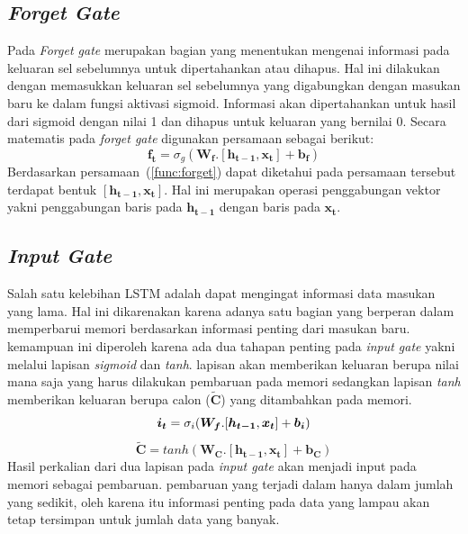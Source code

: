 \subsection{\textit{Forget Gate}}
Pada \textit{Forget gate} merupakan bagian yang menentukan mengenai informasi pada keluaran sel sebelumnya untuk dipertahankan atau dihapus. Hal ini dilakukan dengan memasukkan keluaran sel sebelumnya yang digabungkan dengan masukan baru ke dalam fungsi aktivasi sigmoid. Informasi akan dipertahankan untuk hasil dari sigmoid dengan nilai 1 dan dihapus untuk keluaran yang bernilai 0. Secara matematis pada \textit{forget gate} digunakan persamaan sebagai berikut:
\begin{equation}
	\boldsymbol{f_t} = \sigma_g(\boldsymbol{W_{f}}.[\boldsymbol{h_{t-1}}, \boldsymbol{x_t}] + \boldsymbol{b_f})
	\label{func:forget}
\end{equation} 
Berdasarkan persamaan~(\ref{func:forget}) dapat diketahui pada persamaan tersebut terdapat bentuk $[\boldsymbol{h_{t-1}}, \boldsymbol{x_t}]$. Hal ini merupakan operasi penggabungan vektor yakni penggabungan baris pada $\boldsymbol{h_{t-1}}$ dengan baris pada $\boldsymbol{x_t}$.
\subsection{\textit{Input Gate}}
Salah satu kelebihan LSTM adalah dapat mengingat informasi data masukan yang lama. Hal ini dikarenakan karena adanya satu bagian yang berperan dalam memperbarui memori berdasarkan informasi penting dari masukan baru. kemampuan ini diperoleh karena ada dua tahapan penting pada \textit{input gate} yakni melalui lapisan \textit{sigmoid} dan \textit{tanh}. lapisan akan memberikan keluaran berupa nilai mana saja yang harus dilakukan pembaruan pada memori sedangkan lapisan \textit{tanh} memberikan keluaran berupa calon ($\boldsymbol{\tilde{C}}$) yang ditambahkan pada memori. 
\begin{equation}
	\boldsymbol{i_t} = \sigma_i(\boldsymbol{W_{f}}.[\boldsymbol{h_{t-1}}, \boldsymbol{x_t}] + \boldsymbol{b_i})\\
	\label{func:input}
\end{equation}
\begin{equation}
	\boldsymbol{\tilde{C}} = tanh(\boldsymbol{W_{C}}.[\boldsymbol{h_{t-1}}, \boldsymbol{x_t}] + \boldsymbol{b_C})
	\label{func:C-tilde}
\end{equation}
Hasil perkalian dari dua lapisan pada \textit{input gate} akan menjadi input pada memori sebagai pembaruan. pembaruan yang terjadi dalam hanya dalam jumlah yang sedikit, oleh karena itu informasi penting pada data yang lampau akan tetap tersimpan untuk jumlah data yang banyak.

